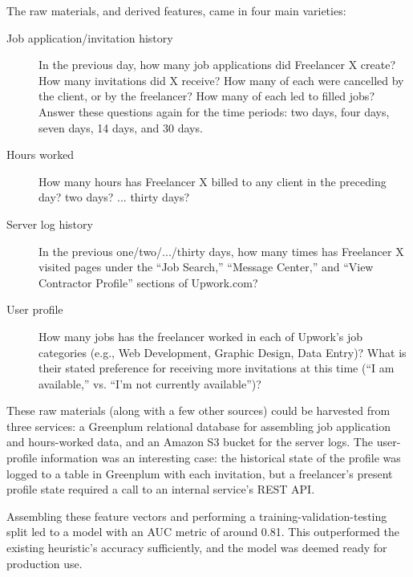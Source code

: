 \documentclass{article}
\begin{document}
The raw materials, and derived features, came in four main varieties:

\begin{description}
\item[Job application/invitation history] In the previous day, how many job applications did Freelancer X create? How many invitations did X receive? How many of each were cancelled by the client, or by the freelancer? How many of each led to filled jobs? Answer these questions again for the time periods: two days, four days, seven days, 14 days, and 30 days.
\item[Hours worked] How many hours has Freelancer X billed to any client in the preceding day? two days? ... thirty days?
\item[Server log history] In the previous one/two/.../thirty days, how many times has Freelancer X visited pages under the ``Job Search,'' ``Message Center,'' and ``View Contractor Profile'' sections of Upwork.com?
\item[User profile] How many jobs has the freelancer worked in each of Upwork's job categories (e.g., Web Development, Graphic Design, Data Entry)? What is their stated preference for receiving more invitations at this time (``I am available,'' vs. ``I'm not currently available'')? 
\end{description}

These raw materials (along with a few other sources) could be harvested from three services: a Greenplum relational database for assembling job application and hours-worked data, and an Amazon S3 bucket for the server logs. The user-profile information was an interesting case: the historical state of the profile was logged to a table in Greenplum with each invitation, but a freelancer's present profile state required a call to an internal service's REST API.

Assembling these feature vectors and performing a training-validation-testing split led to a model with an AUC metric of around 0.81. This outperformed the existing heuristic's accuracy sufficiently, and the model was deemed ready for production use.
\end{document}
